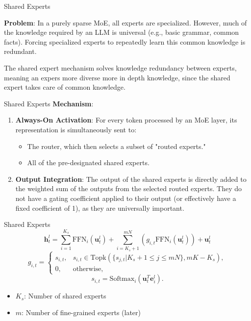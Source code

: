 \documentclass{beamer}
\begin{document}
\begin{frame}{Shared Experts}
  
  \textbf{Problem}: In a purely sparse MoE, all experts are specialized. However, much of the knowledge required by an LLM is universal (e.g., basic grammar, common facts). 
  Forcing specialized experts to repeatedly learn this common knowledge is redundant. \cite{dai2024deepseekmoe}


  The shared expert mechanism solves knowledge redundancy between experts, meaning an expers more diverse 
  more in depth knowledge, since the shared expert takes care of common knowledge. \cite{dai2024deepseekmoe}
\end{frame}

\begin{frame}{Shared Experts}
\textbf{Mechanism}:
\begin{enumerate}
  \item \textbf{Always-On Activation}: For every token processed by an MoE layer, its representation is simultaneously sent to:
    \begin{itemize}
      \item The router, which then selects a subset of "routed experts."
      \item All of the pre-designated shared experts.
    \end{itemize} 
  \item \textbf{Output Integration}: The output of the shared experts is directly added to the weighted sum of the outputs from the selected routed experts. They do not have a gating coefficient applied to their 
  output (or effectively have a fixed coefficient of 1), as they are universally important.
\end{enumerate}  
\end{frame}

\begin{frame}{Shared Experts}
  $$ \mathbf{h}^l_t = \sum_{i=1}^{K_s} \text{FFN}_i (\mathbf{u}^l_t) + \sum_{i=K_s+1}^{mN} \left(g_{i,t} \text{FFN}_i (\mathbf{u}^l_t)\right) + \mathbf{u}^l_t $$
  $$ g_{i,t} = \begin{cases} s_{i,t}, & s_{i,t} \in \text{Topk}(\{s_{j,t}|K_s + 1 \le j \le mN\}, mK - K_s), \\ 0, & \text{otherwise}, \end{cases} $$
  $$ s_{i,t} = \text{Softmax}_i \left(\mathbf{u}_t^T \mathbf{e}_i^l\right). $$

  \begin{itemize}
    \item $K_s$: Number of shared experts
    \item $m$: Number of fine-grained experts (later)
  \end{itemize}
  \cite{dai2024deepseekmoe}
\end{frame}
\end{document}

